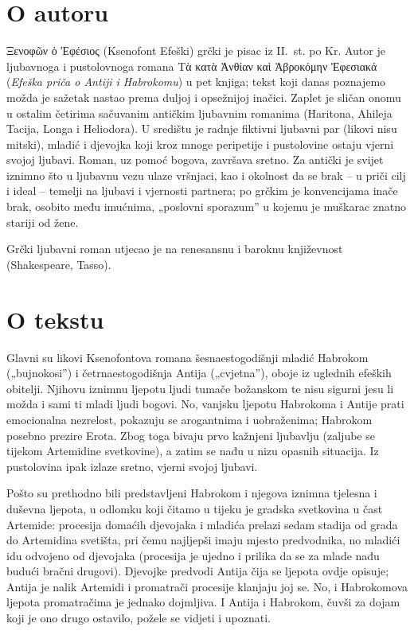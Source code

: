 
\section*{O autoru}

\textgreek[variant=ancient]{Ξενοφῶν ὁ Ἐφέσιος} (Ksenofont Efeški) grčki je pisac iz II.~st. po Kr. Autor je ljubavnoga i pustolovnoga romana \textgreek[variant=ancient]{Τὰ κατὰ Ἀνθίαν καὶ Ἁβροκόμην Ἐφεσιακά} (\textit{Efeška priča o Antiji i Habrokomu}) u pet knjiga; tekst koji danas poznajemo možda je sažetak nastao prema duljoj i opsežnijoj inačici. Zaplet je sličan onomu u ostalim četirima sačuvanim antičkim ljubavnim romanima (Haritona, Ahileja Tacija, Longa i Heliodora). U središtu je radnje fiktivni ljubavni par (likovi nisu mitski), mladić i djevojka koji kroz mnoge peripetije i pustolovine ostaju vjerni svojoj ljubavi. Roman, uz pomoć bogova, završava sretno. Za antički je svijet iznimno što u ljubavnu vezu ulaze vršnjaci, kao i okolnost da se brak – u priči cilj i ideal – temelji na ljubavi i vjernosti partnera; po grčkim je konvencijama inače brak, osobito među imućnima, „poslovni sporazum'' u kojemu je muškarac znatno stariji od žene.

Grčki ljubavni roman utjecao je na renesansnu i baroknu književnost (Shakespeare, Tasso).

\section*{O tekstu}

Glavni su likovi Ksenofontova romana šesnaestogodišnji mladić Habrokom („bujnokosi'') i četrnaestogodišnja Antija („cvjetna''), oboje iz uglednih efeških obitelji. Njihovu iznimnu ljepotu ljudi tumače božanskom te nisu sigurni jesu li možda i sami ti mladi ljudi bogovi. No, vanjsku ljepotu Habrokoma i Antije prati emocionalna nezrelost, pokazuju se arogantnima i uobraženima; Habrokom posebno prezire Erota. Zbog toga bivaju prvo kažnjeni ljubavlju (zaljube se tijekom Artemidine svetkovine), a zatim se nađu u nizu opasnih situacija. Iz pustolovina ipak izlaze sretno, vjerni svojoj ljubavi.

Pošto su prethodno bili predstavljeni Habrokom i njegova iznimna tjelesna i duševna ljepota, u odlomku koji čitamo u tijeku je gradska svetkovina u čast Artemide: procesija domaćih djevojaka i mladića prelazi sedam stadija od grada do Artemidina svetišta, pri čemu najljepši imaju mjesto predvodnika, no mladići idu odvojeno od djevojaka (procesija je ujedno i prilika da se za mlade nađu budući bračni drugovi). Djevojke predvodi Antija čija se ljepota ovdje opisuje; Antija je nalik Artemidi i promatrači procesije klanjaju joj se. No, i Habrokomova ljepota promatračima je jednako dojmljiva. I Antija i Habrokom, čuvši za dojam koji je ono drugo ostavilo, požele se vidjeti i upoznati.

